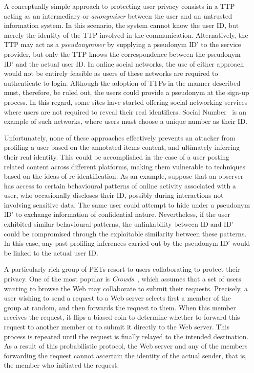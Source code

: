 A conceptually simple approach to protecting user privacy consists in a TTP acting as an intermediary or \emph{anonymiser} between the user and an untrusted information system. In this scenario, the system cannot know the user ID, but merely the identity of the TTP involved in the communication. Alternatively, the TTP may act as a \emph{pseudonymiser} by supplying a pseudonym ID' to the service provider, but only the TTP knows the correspondence between the pseudonym ID' and the actual user ID. In online social networks, the use of either approach would not be entirely feasible as users of these networks are required to authenticate to login. Although the adoption of TTPs in the manner described must, therefore, be ruled out, the users could provide a pseudonym at the sign-up process. In this regard, some sites have started offering social-networking services where users are not required to reveal their real identifiers. Social Number~\cite{SocialNumber} is an example of such networks, where users must choose a unique number as their ID.

Unfortunately, none of these approaches effectively prevents an attacker from profiling a user based on the annotated items content, and ultimately inferring their real identity. This could be accomplished in the case of a user posting related content across different platforms, making them vulnerable to techniques based on the ideas of re-identification. As an example, suppose that an observer has access to certain behavioural patterns of online activity associated with a user, who occasionally discloses their ID, possibly during interactions not involving sensitive data. The same user could attempt to hide under a pseudonym ID' to exchange information of confidential nature. Nevertheless, if the user exhibited similar behavioural patterns, the unlinkability between ID and ID' could be compromised through the exploitable similarity between these patterns. In this case, any past profiling inferences carried out by the pseudonym ID' would be linked to the actual user ID.

A particularly rich group of PETs resort to users collaborating to protect their privacy. One of the most popular is \emph{Crowds}~\cite{Reiter98ISS}, which assumes that a set of users wanting to browse the Web may collaborate to submit their requests. Precisely, a user wishing to send a request to a Web server selects first a member of the group at random, and then forwards the request to them. When this member receives the request, it flips a biased coin to determine whether to forward this request to another member or to submit it directly to the Web server. This process is repeated until the request is finally relayed to the intended destination. As a result of this probabilistic protocol, the Web server and any of the members forwarding the request cannot ascertain the identity of the actual sender, that is, the member who initiated the request.

